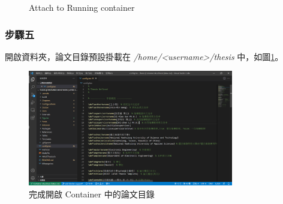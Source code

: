 \begin{figure}[H] 
        \centering 
        \quad
        \centering 
        \caption{Attach to Running container}
\end{figure}

\subsubsection*{步驟五}

開啟資料夾，論文目錄預設掛載在 \emph{/home/<username>/thesis} 中，如圖\ref{fig_vscode_finish}。

\begin{figure}[H] 
        \centering 
        \includegraphics[width=0.8\textwidth]{./Figures/Env/docker/vscode_finish.png} 
        \caption{完成開啟 Container 中的論文目錄}
        \label{fig_vscode_finish}
\end{figure}
